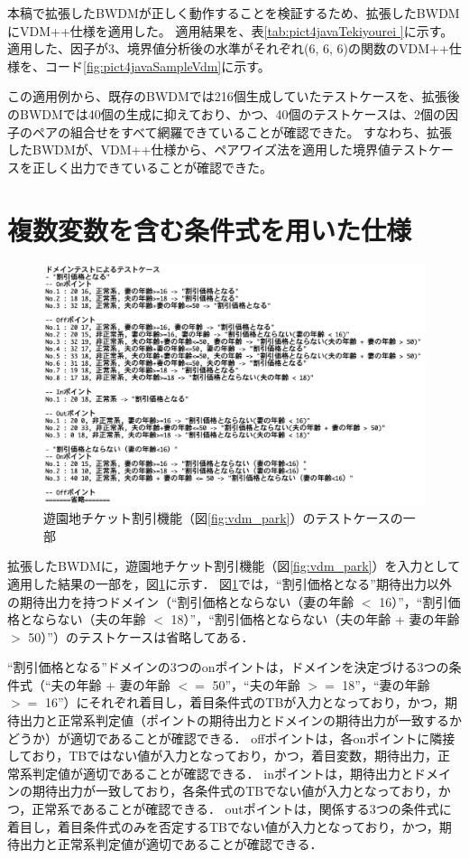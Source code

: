 \documentclass[uplatex, report, a4j, 10pt]{jsbook}
\begin{document}
本稿で拡張したBWDMが正しく動作することを検証するため、拡張したBWDMにVDM++仕様を適用した。
適用結果を、表\ref{tab:pict4javaTekiyourei }に示す。
適用した、因子が3、境界値分析後の水準がそれぞれ(6, 6, 6)の関数のVDM++仕様を、コード\ref{fig:pict4javaSampleVdm}に示す。

この適用例から、既存のBWDMでは216個生成していたテストケースを、拡張後のBWDMでは40個の生成に抑えており、かつ、40個のテストケースは、2個の因子のペアの組合せをすべて網羅できていることが確認できた。
すなわち、拡張したBWDMが、VDM++仕様から、ペアワイズ法を適用した境界値テストケースを正しく出力できていることが確認できた。


\section{複数変数を含む条件式を用いた仕様}
\begin{figure}[tp]
  \centering
  \includegraphics[keepaspectratio, width=160mm]{figs/tekiyourei}
  \caption{遊園地チケット割引機能（図\ref{fig:vdm_park}）のテストケースの一部}
  \label{fig:park_testcase}
\end{figure}

拡張したBWDMに，遊園地チケット割引機能（図\ref{fig:vdm_park}）を入力として適用した結果の一部を，図\ref{fig:park_testcase}に示す．
図\ref{fig:park_testcase}では，“割引価格となる”期待出力以外の期待出力を持つドメイン（“割引価格とならない（妻の年齢 $<$ 16）”，“割引価格とならない（夫の年齢 $<$ 18）”，“割引価格とならない（夫の年齢 + 妻の年齢 $>$ 50）”）のテストケースは省略してある．

“割引価格となる”ドメインの3つのonポイントは，ドメインを決定づける3つの条件式（“夫の年齢 + 妻の年齢 $<=$ 50”，“夫の年齢 $>=$ 18”，“妻の年齢 $>=$ 16”）にそれぞれ着目し，着目条件式のTBが入力となっており，かつ，期待出力と正常系判定値（ポイントの期待出力とドメインの期待出力が一致するかどうか）が適切であることが確認できる．
offポイントは，各onポイントに隣接しており，TBではない値が入力となっており，かつ，着目変数，期待出力，正常系判定値が適切であることが確認できる．
inポイントは，期待出力とドメインの期待出力が一致しており，各条件式のTBでない値が入力となっており，かつ，正常系であることが確認できる．
outポイントは，関係する3つの条件式に着目し，着目条件式のみを否定するTBでない値が入力となっており，かつ，期待出力と正常系判定値が適切であることが確認できる．
\end{document}
